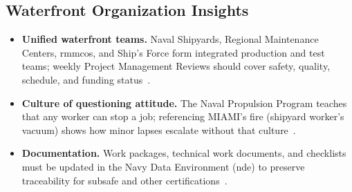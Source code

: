 \documentclass[../main.tex]{subfiles}
\begin{document}
\subsection{Waterfront Organization Insights}
\begin{itemize}
\item \textbf{Unified waterfront teams.} Naval Shipyards, Regional Maintenance Centers, \ac{rmmco}s, and Ship's Force form integrated production and test teams; weekly Project Management Reviews should cover safety, quality, schedule, and funding status~\autocite{edo-4-1-5-waterfront-work-control-2025}.
\item \textbf{Culture of questioning attitude.} The Naval Propulsion Program teaches that any worker can stop a job; referencing MIAMI's fire (shipyard worker's vacuum) shows how minor lapses escalate without that culture~\autocite{edo-4-1-5-waterfront-work-control-2025}.
\item \textbf{Documentation.} Work packages, technical work documents, and checklists must be updated in the Navy Data Environment (\ac{nde}) to preserve traceability for \ac{subsafe} and other certifications~\autocite{NAVSEA-0924-062-0010}.
\end{itemize}

\end{document}
